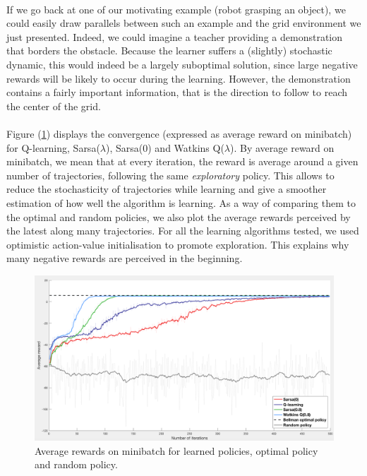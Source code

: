 \documentclass[a4paper]{report}
\begin{document}
{{			\paragraph{} If we go back at one of our motivating example (robot grasping an object), we could easily draw parallels between such an example and the grid environment we just presented. Indeed, we could imagine a teacher providing a demonstration that borders the obstacle. Because the learner suffers a (slightly) stochastic dynamic, this would indeed be a largely suboptimal solution, since large negative rewards will be likely to occur during the learning. However, the demonstration contains a fairly important information, that is the direction to follow to reach the center of the grid. 
						
			\paragraph{} Figure (\ref{fig::comp_maze}) displays the convergence (expressed as average reward on minibatch) for Q-learning, Sarsa($\lambda$), Sarsa(0) and Watkins Q($\lambda$). By average reward on minibatch, we mean that at every iteration, the reward is average around a given number of trajectories, following the same \emph{exploratory} policy. This allows to reduce the stochasticity of trajectories while learning and give a smoother estimation of how well the algorithm is learning. As a way of comparing them to the optimal and random policies, we also plot the average rewards perceived by the latest along many trajectories. \newline
For all the learning algorithms tested, we used optimistic action-value initialisation to promote exploration. This explains why many negative rewards are perceived in the beginning. 
				
			\begin{figure}
				\begin{center}
					\includegraphics[width=\linewidth]{comp_maze}
					\caption{Average rewards on minibatch for learned policies, optimal policy and random policy.}
					\label{fig::comp_maze}
				\end{center}
			\end{figure}
		}
}
\end{document}
